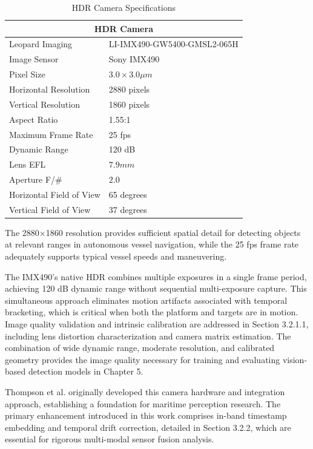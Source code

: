 \documentclass{erauthesis}
\begin{document}
\begin{table}[h]
\centering
\caption{HDR Camera Specifications}
\begin{tabular}{ll}
\hline
\multicolumn{2}{c}{HDR Camera}\\
\hline
\hline
Leopard Imaging & LI-IMX490-GW5400-GMSL2-065H \\
Image Sensor & Sony IMX490 \\
Pixel Size & $3.0 \times 3.0 \mu m$ \\
Horizontal Resolution & 2880 pixels \\
Vertical Resolution & 1860 pixels \\
Aspect Ratio & 1.55:1 \\
Maximum Frame Rate & 25 fps \\
Dynamic Range & 120 dB \\
Lens EFL & $7.9 mm$\\
Aperture F/\# & $2.0$ \\
Horizontal Field of View & 65 degrees \\
Vertical Field of View & 37 degrees \\
\hline
\end{tabular}
\label{tab:hdr_camera_specs}
\end{table}

The 2880×1860 resolution provides sufficient spatial detail for detecting objects at relevant ranges in autonomous vessel navigation, while the 25 fps frame rate adequately supports typical vessel speeds and maneuvering.

The IMX490's native \ac{HDR} combines multiple exposures in a single frame period, achieving 120 dB dynamic range without sequential multi-exposure capture.
This simultaneous approach eliminates motion artifacts associated with temporal bracketing, which is critical when both the platform and targets are in motion.
Image quality validation and intrinsic calibration are addressed in Section 3.2.1.1, including lens distortion characterization and camera matrix estimation.
The combination of wide dynamic range, moderate resolution, and calibrated geometry provides the image quality necessary for training and evaluating vision-based detection models in Chapter 5.

Thompson et al. \cite{thompson2023} originally developed this camera hardware and integration approach, establishing a foundation for maritime perception research.
The primary enhancement introduced in this work comprises in-band timestamp embedding and temporal drift correction, detailed in Section 3.2.2, which are essential for rigorous multi-modal sensor fusion analysis.
\end{document}
